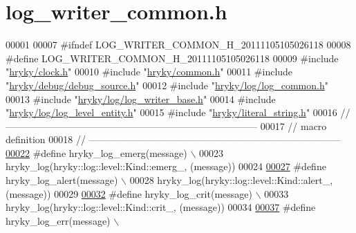 \hypertarget{log__writer__common_8h_source}{\section{log\-\_\-writer\-\_\-common.\-h}
}

\begin{DoxyCode}
00001 
00007 \textcolor{preprocessor}{#ifndef LOG\_WRITER\_COMMON\_H\_20111105105026118}
00008 \textcolor{preprocessor}{}\textcolor{preprocessor}{#define LOG\_WRITER\_COMMON\_H\_20111105105026118}
00009 \textcolor{preprocessor}{}\textcolor{preprocessor}{#include "\hyperlink{clock_8h}{hryky/clock.h}"}
00010 \textcolor{preprocessor}{#include "\hyperlink{common_8h}{hryky/common.h}"}
00011 \textcolor{preprocessor}{#include "\hyperlink{debug__source_8h}{hryky/debug/debug_source.h}"}
00012 \textcolor{preprocessor}{#include "\hyperlink{log__common_8h}{hryky/log/log_common.h}"}
00013 \textcolor{preprocessor}{#include "\hyperlink{log__writer__base_8h}{hryky/log/log_writer_base.h}"}
00014 \textcolor{preprocessor}{#include "\hyperlink{log__level__entity_8h}{hryky/log/log_level_entity.h}"}
00015 \textcolor{preprocessor}{#include "\hyperlink{literal__string_8h}{hryky/literal_string.h}"}
00016 \textcolor{comment}{//
      ------------------------------------------------------------------------------}
00017 \textcolor{comment}{// macro definition}
00018 \textcolor{comment}{//
      ------------------------------------------------------------------------------}
\hypertarget{log__writer__common_8h_source_l00022}{}\hyperlink{log__writer__common_8h_a8d142be5e91677a27be199c3f4115ba6}{00022} \textcolor{comment}{}\textcolor{preprocessor}{#define hryky\_log\_emerg(message) \(\backslash\)}
00023 \textcolor{preprocessor}{    hryky\_log(hryky::log::level::Kind::emerg\_, (message))}
00024 \textcolor{preprocessor}{}
\hypertarget{log__writer__common_8h_source_l00027}{}\hyperlink{log__writer__common_8h_a8cb8f66bf45015fc1b64ed8d52bf8d59}{00027} \textcolor{preprocessor}{#define hryky\_log\_alert(message) \(\backslash\)}
00028 \textcolor{preprocessor}{    hryky\_log(hryky::log::level::Kind::alert\_, (message))}
00029 \textcolor{preprocessor}{}
\hypertarget{log__writer__common_8h_source_l00032}{}\hyperlink{log__writer__common_8h_a61bcce4d8e91e6fde78ce1be7d9ceac8}{00032} \textcolor{preprocessor}{#define hryky\_log\_crit(message) \(\backslash\)}
00033 \textcolor{preprocessor}{    hryky\_log(hryky::log::level::Kind::crit\_, (message))}
00034 \textcolor{preprocessor}{}
\hypertarget{log__writer__common_8h_source_l00037}{}\hyperlink{log__writer__common_8h_ae5ad3dabb33f594695ef40753cb78aad}{00037} \textcolor{preprocessor}{#define hryky\_log\_err(message) \(\backslash\)}

\end{DoxyCode}
